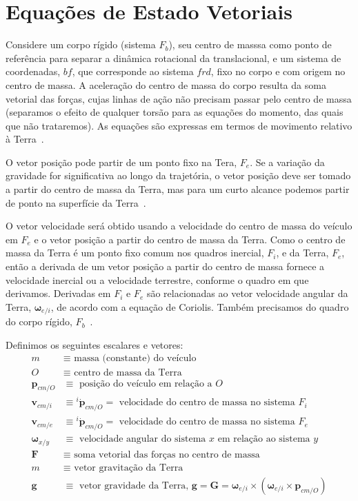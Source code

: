 \section{Equações de Estado Vetoriais}

Considere um corpo rígido (sistema \(F_{b}\)), seu centro de masssa como ponto de referência para separar a dinâmica rotacional da translacional, e um sistema de coordenadas, \(bf\), que corresponde ao sistema \(frd\), fixo no corpo e com origem no centro de massa. A aceleração do centro de massa do corpo resulta da soma vetorial das forças, cujas linhas de ação não precisam passar pelo centro de massa (separamos o efeito de qualquer torsão para as equações do momento, das quais que não trataremos). As equações são expressas em termos de movimento relativo à Terra~\cite{Stevens2016}.

O vetor posição pode partir de um ponto fixo na Tera, \(F_{e}\). Se a variação da gravidade for significativa ao longo da trajetória, o vetor posição deve ser tomado a partir do centro de massa da Terra, mas para um curto alcance podemos partir de ponto na superfície da Terra~\cite{Stevens2016}.

O vetor velocidade será obtido usando a velocidade do centro de massa do veículo em \(F_{e}\) e o vetor posição a partir do centro de massa da Terra. Como o centro de massa da Terra é um ponto fixo comum nos quadros inercial, \(F_{i}\),  e da Terra, \(F_{e}\), então a derivada de um vetor posição a partir do centro de massa fornece a velocidade inercial ou a velocidade terrestre, conforme o quadro em que derivamos. Derivadas em \(F_{i}\) e \(F_{e}\) são relacionadas ao vetor velocidade angular da Terra, \(\mathbf{\omega}_{e/i}\), de acordo com a equação de Coriolis. Também precisamos do quadro do corpo rígido, \(F_{b}\)~\cite{Stevens2016}.

Definimos os seguintes escalares e vetores:
\begin{align*}
   m &\equiv \text{ massa (constante) do veículo} \\
   O &\equiv \text{ centro de massa da Terra} \\
   \mathbf{p}_{cm/O} &\equiv \text{ posição do veículo em relação a }O \\
   \mathbf{v}_{cm/i} &\equiv {^{i}\dot{\mathbf{p}}_{cm/O}} = \text{ velocidade do centro de massa no sistema }F_{i} \\
   \mathbf{v}_{cm/e} &\equiv {^{i}\dot{\mathbf{p}}_{cm/O}} = \text{ velocidade do centro de massa no sistema }F_{e}  \\
   \mathbf{\omega}_{x/y} &\equiv \text{ velocidade angular do sistema \(x\) em relação ao sistema \(y\)} \\
   \mathbf{F} &\equiv \text{ soma vetorial das forças no centro de massa} \\
   m &\equiv \text{ vetor gravitação da Terra} \\
   \mathbf{g} &\equiv \text{ vetor gravidade da Terra, }\mathbf{g} = \mathbf{G} = \mathbf{\omega}_{e/i} \times \left( \mathbf{\omega}_{e/i} \times  \mathbf{p}_{cm/O} \right) \\
\end{align*}

